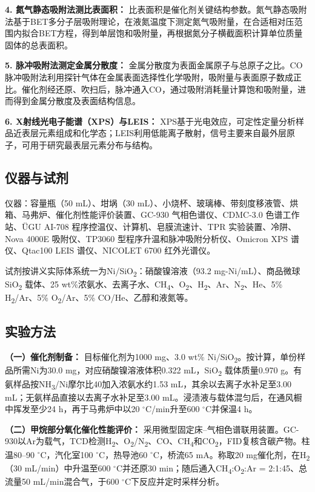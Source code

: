 \documentclass[a4paper]{article}
\begin{document}
\textbf{4. 氮气静态吸附法测比表面积：} 比表面积是催化剂关键结构参数。氮气静态吸附法基于BET多分子层吸附理论，在液氮温度下测定氮气吸附量，在合适相对压范围内拟合BET方程，得到单层饱和吸附量，再根据氮分子横截面积计算单位质量固体的总表面积。

\textbf{5. 脉冲吸附法测定金属分散度：} 金属分散度为表面金属原子与总原子之比。CO脉冲吸附法利用探针气体在金属表面选择性化学吸附，吸附量与表面原子数成正比。催化剂经还原、吹扫后，脉冲通入CO，通过吸附消耗量计算饱和吸附量，进而得到金属分散度及表面结构信息。

\textbf{6. X射线光电子能谱（XPS）与LEIS：} XPS基于光电效应，可定性定量分析样品近表层元素组成和化学态；LEIS利用低能离子散射，信号主要来自最外层原子，可用于研究最表层元素分布与结构。

\subsection{仪器与试剂}

仪器：容量瓶（50 mL）、坩埚（30 mL）、小烧杯、玻璃棒、带刻度移液管、烘箱、马弗炉、催化剂性能评价装置、GC-930 气相色谱仪、CDMC-3.0 色谱工作站、ÜGU AI-708 程序控温仪、计算机、皂膜流速计、TPR 实验装置、冷阱、Nova 4000E 吸附仪、TP3060 型程序升温和脉冲吸附分析仪、Omicron XPS 谱仪、Qtac100 LEIS 谱仪、NICOLET 6700 红外光谱仪。

试剂按讲义实际体系统一为Ni/SiO\textsubscript{2}：硝酸镍溶液（93.2 mg-Ni/mL）、商品微球SiO\textsubscript{2} 载体、25 wt\%浓氨水、去离子水、CH\textsubscript{4}、O\textsubscript{2}、H\textsubscript{2}、Ar、N\textsubscript{2}、He、5\% H\textsubscript{2}/Ar、5\% O\textsubscript{2}/Ar、5\% CO/He、乙醇和液氮等。

\subsection{实验方法}

\textbf{（一）催化剂制备：} 目标催化剂为1000 mg、3.0 wt\% Ni/SiO\textsubscript{2}。按计算，单份样品所需Ni为30.0 mg，对应硝酸镍溶液体积0.322 mL，SiO\textsubscript{2} 载体质量0.970 g。有氨样品按NH\textsubscript{3}/Ni摩尔比40加入浓氨水约1.53 mL，其余以去离子水补足至3.00 mL；无氨样品直接以去离子水补足至3.00 mL。浸渍液与载体混匀后，在通风橱中挥发至少24 h，再于马弗炉中以20 $^\circ$C/min升至600 $^\circ$C并保温4 h。

\textbf{（二）甲烷部分氧化催化性能评价：} 采用微型固定床--气相色谱联用装置。GC-930以Ar为载气，TCD检测H\textsubscript{2}、O\textsubscript{2}/N\textsubscript{2}、CO、CH\textsubscript{4}和CO\textsubscript{2}，FID复核含碳产物。柱温80--90 $^\circ$C，汽化室100 $^\circ$C，热导池60 $^\circ$C，桥流65 mA。称取20 mg催化剂，在H\textsubscript{2}（30 mL/min）中升温至600 $^\circ$C并还原30 min；随后通入CH\textsubscript{4}:O\textsubscript{2}:Ar = 2:1:45、总流量50 mL/min混合气，于600 $^\circ$C下反应并定时采样分析。
\end{document}
